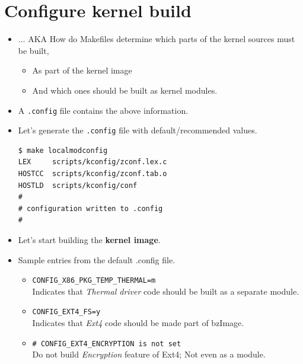 \documentclass{beamer}
\begin{document}
\section{Configure kernel build}
\label{sec:configure-kbuild}

\begin{frame}[fragile]
  \begin{itemize}
  \item ... AKA How do Makefiles determine which parts of the kernel sources must be built,
    \begin{itemize}
    \item As part of the kernel image
    \item And which ones should be built as kernel modules.
    \end{itemize}
  \item A \texttt{.config} file contains the above information.
  \item Let's generate the \texttt{.config} file with default/recommended
    values.
    \begin{lstlisting}
$ make localmodconfig
LEX     scripts/kconfig/zconf.lex.c
HOSTCC  scripts/kconfig/zconf.tab.o
HOSTLD  scripts/kconfig/conf
#
# configuration written to .config
#
\end{lstlisting}
  \item Let's start building the \textbf{kernel image}.
\end{itemize}
\end{frame}

\begin{frame}[fragile]
  \begin{itemize}
\item Sample entries from the default .config file.
  \begin{itemize}
  \item \texttt{CONFIG\_X86\_PKG\_TEMP\_THERMAL=m} \\
    Indicates that \emph{Thermal driver} code should be built as a separate module.
  \item \texttt{CONFIG\_EXT4\_FS=y} \\
    Indicates that \emph{Ext4} code should be made part of bzImage.
  \item \texttt{\# CONFIG\_EXT4\_ENCRYPTION is not set} \\
    Do not build \emph{Encryption} feature of Ext4; Not even as a module.
  \end{itemize}
\begin{lstlisting}
\end{lstlisting}
\end{itemize}
\end{frame}
\end{document}
